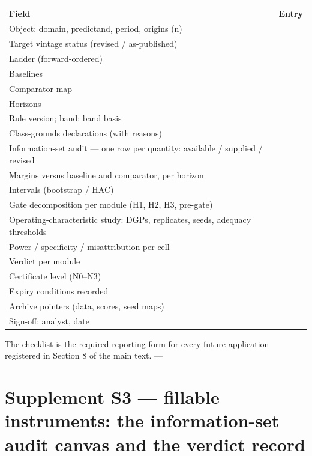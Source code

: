 \documentclass[11pt]{article}
\begin{document}
{\def\LTcaptype{none} %
\begin{longtable}[]{@{}
  >{\raggedright\arraybackslash}p{}
  >{\raggedright\arraybackslash}p{}@{}}
\toprule\noalign{}
\begin{minipage}[b]{\linewidth}\raggedright
Field
\end{minipage} & \begin{minipage}[b]{\linewidth}\raggedright
Entry
\end{minipage} \\
\midrule\noalign{}
\endhead
\bottomrule\noalign{}
\endlastfoot
Object: domain, predictand, period, origins (n) & \\
Target vintage status (revised / as-published) & \\
Ladder (forward-ordered) & \\
Baselines & \\
Comparator map & \\
Horizons & \\
Rule version; band; band basis & \\
Class-grounds declarations (with reasons) & \\
Information-set audit --- one row per quantity: available / supplied /
revised & \\
Margins versus baseline and comparator, per horizon & \\
Intervals (bootstrap / HAC) & \\
Gate decomposition per module (H1, H2, H3, pre-gate) & \\
Operating-characteristic study: DGPs, replicates, seeds, adequacy
thresholds & \\
Power / specificity / misattribution per cell & \\
Verdict per module & \\
Certificate level (N0--N3) & \\
Expiry conditions recorded & \\
Archive pointers (data, scores, seed maps) & \\
Sign-off: analyst, date & \\
\end{longtable}
}

The checklist is the required reporting form for every future
application registered in Section 8 of the main text. ---

\section{Supplement S3 --- fillable instruments: the information-set
audit canvas and the verdict
record}\label{supplement-s3-fillable-instruments-the-information-set-audit-canvas-and-the-verdict-record}
\end{document}
